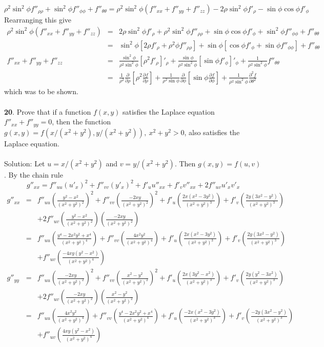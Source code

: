 \documentclass[12pt]{amsbook}
\begin{document}
$$\rho^2\sin^2\phi f''_{\rho\rho}+\sin^2\phi f''_{\phi\phi}+f''_{\theta\theta}=\rho^2\sin^2\phi(f''_{xx}+f''_{yy}+f''_{zz})-2\rho\sin^2\phi f'_{\rho}-\sin\phi\cos\phi f'_{\phi}$$
Rearranging this give
\begin{eqnarray*}
\rho^2\sin^2\phi(f''_{xx}+f''_{yy}+f''_{zz})&=&2\rho\sin^2\phi f'_{\rho}+\rho^2\sin^2\phi f''_{\rho\rho}+\sin \phi\cos \phi f'_{\phi}+\sin^2{\phi}f''_{\phi\phi}+f''_{\theta\theta} \\
&=&\sin^2\phi[2\rho f'_{\rho}+\rho^2\phi f''_{\rho\rho}]+\sin \phi[\cos \phi f'_{\phi}+\sin{\phi}f''_{\phi\phi}]+f''_{\theta\theta} \\
f''_{xx}+f''_{yy}+f''_{zz}&=&\frac{\sin^2\phi}{\rho^2\sin^2\phi}[\rho^2 f'_{\rho}]'_{\rho}+\frac{\sin{\phi}}{\rho^2\sin^2\phi}[\sin \phi f'_{\phi}]'_{\phi}+\frac{1}{\rho^2\sin^2\phi}f''_{\theta\theta} \\
&=&\frac{1}{\rho^2}\frac{\partial}{\partial \rho}[\rho^2 \frac{\partial f}{\partial \rho}]+\frac{1}{\rho^2\sin\phi}\frac{\partial}{\partial \phi}[\sin \phi \frac{\partial f}{\partial \phi}]+\frac{1}{\rho^2\sin^2\phi}\frac{\partial^2 f}{\partial \theta^2} 
\end{eqnarray*}
which was to be shown. 
\\
\\
{\small\bf 20}. Prove that if a function $f(x, y)$ satisfies the Laplace equation $f''_{xx}+f''_{yy}=0$, then the function $g(x, y) = f(x/(x^2+y^2),y/(x^2+y^2)), \ x^2+y^2>0$, also satisfies the Laplace equation.
\\
\\
{\sc Solution}: Let $u=x/(x^2+y^2)$ and $v=y/(x^2+y^2)$. Then $g(x,y)=f(u,v)$. By the chain rule
$$g''_{xx}=f''_{uu}(u'_x)^2+f''_{vv}(y'_x)^2+f'_uu''_{xx}+f'_vv''_{xx}+2f''_{uv}u'_xv'_x$$
\begin{eqnarray*}
g''_{xx}&=&f''_{uu}(\frac{y^2-x^2}{(x^2+y^2)^2})^2+f''_{vv}(\frac{-2xy}{(x^2+y^2)^2})^2+f'_u(\frac{2x(x^2-3y^2)}{(x^2+y^2)^3})+f'_v(\frac{2y(3x^2-y^2)}{(x^2+y^2)^3})\\
&&+2f''_{uv}(\frac{y^2-x^2}{(x^2+y^2)^2})(\frac{-2xy}{(x^2+y^2)^2})\\
&=&f''_{uu}(\frac{y^4-2x^2y^2+x^4}{(x^2+y^2)^4})+f''_{vv}(\frac{4x^2y^2}{(x^2+y^2)^4})+f'_u(\frac{2x(x^2-3y^2)}{(x^2+y^2)^3})+f'_v(\frac{2y(3x^2-y^2)}{(x^2+y^2)^3})\\
&&+f''_{uv}(\frac{-4xy(y^2-x^2)}{(x^2+y^2)^4})\\
g''_{yy}&=&f''_{uu}(\frac{-2xy}{(x^2+y^2)^2})^2+f''_{vv}(\frac{x^2-y^2}{(x^2+y^2)^2})^2+f'_u(\frac{2x(3y^2-x^2)}{(x^2+y^2)^3})+f'_v(\frac{2y(y^2-3x^2)}{(x^2+y^2)^3})\\
&&+2f''_{uv}(\frac{-2xy}{(x^2+y^2)^2})(\frac{x^2-y^2}{(x^2+y^2)^2}) \\
&=&f''_{uu}(\frac{4x^2y^2}{(x^2+y^2)^4})+f''_{vv}(\frac{y^4-2x^2y^2+x^4}{(x^2+y^2)^4})+f'_u(\frac{-2x(x^2-3y^2)}{(x^2+y^2)^3})+f'_v(\frac{-2y(3x^2-y^2)}{(x^2+y^2)^3})\\
&&+f''_{uv}(\frac{4xy(y^2-x^2)}{(x^2+y^2)^4})
\end{eqnarray*}
\end{document}
